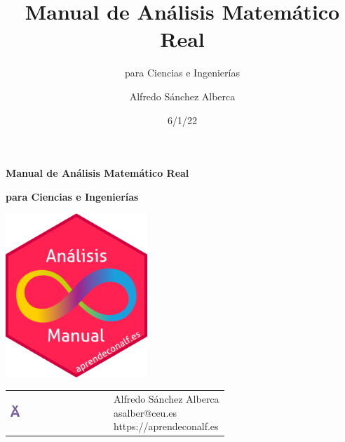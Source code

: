 \documentclass[
  a4paper,
]{scrreport}
\title{Manual de Análisis Matemático Real}
\subtitle{para Ciencias e Ingenierías}
\author{Alfredo Sánchez Alberca}
\date{6/1/22}
\theoremstyle{plain}
\theoremstyle{plain}
\theoremstyle{definition}
\theoremstyle{definition}
\theoremstyle{plain}
\theoremstyle{remark}
\begin{document}
\begin{titlepage}

\begin{center}
\vspace*{5cm}

\Huge
{\textbf{\textsf{Manual de Análisis Matemático Real}}}

\vspace{0.5cm}
\LARGE
{\textbf{\textsf{para Ciencias e Ingenierías}}}

\vspace{1.5cm}

\includegraphics[width=0.4\textwidth]{img/logos/sticker.png}
\end{center}

\vfill

\begin{flushleft}
\begin{tabular}{ll}
\includegraphics[width=0.1\textwidth]{img/logos/aprendeconalf.png} & \parbox[b]{5cm}{\Large\textsf{Alfredo
Sánchez
Alberca}\\ \textsf{asalber@ceu.es} \\ \textsf{https://aprendeconalf.es}}
\end{tabular}
\end{flushleft}
\end{titlepage}\ifdefined\Shaded\renewenvironment{Shaded}{\begin{tcolorbox}[boxrule=0pt, borderline west={3pt}{0pt}{shadecolor}, enhanced, breakable, interior hidden, sharp corners, frame hidden]}{\end{tcolorbox}}\fi
\end{document}
